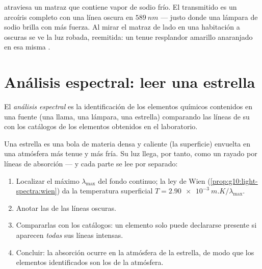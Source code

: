 \begin{example}\label{ex:g10:light-spectra:sodiumflask}
 atraviesa un matraz que contiene vapor de sodio frío. El
 transmitido es un arcoíris completo con una línea oscura en
$\qty{589}{nm}$ --- justo donde una lámpara de sodio brilla con más
fuerza. Al mirar el matraz de lado en una habitación a oscuras se ve la
luz robada, reemitida: un tenue resplandor amarillo anaranjado en esa
misma .
\end{example}

\section{Análisis espectral: leer una estrella}

\begin{definition}\label{def:g10:light-spectra:analysis}
El \emph{análisis espectral} es la
identificación de los elementos químicos contenidos en una fuente (una
llama, una lámpara, una estrella) comparando las líneas de su 
con los catálogos de los elementos obtenidos en el laboratorio.
\end{definition}

\begin{method}\label{met:g10:light-spectra:reading}
Una estrella es una bola de materia densa y caliente (la superficie)
envuelta en una atmósfera más tenue y más fría. Su luz llega, por tanto,
como un  rayado por líneas de absorción --- y cada
parte se lee por separado:
\begin{enumerate}
  \item Localizar el máximo $\lambda_{\max}$ del fondo continuo; la ley
        de Wien (\cref{prop:g10:light-spectra:wien}) da la temperatura
        superficial $T = \qty{2.90e-3}{m.K} / \lambda_{\max}$.
  \item Anotar las  de las líneas oscuras.
  \item Compararlas con los catálogos: un elemento solo puede declararse
        presente si aparecen \emph{todas} sus líneas intensas.
  \item Concluir: la absorción ocurre en la atmósfera de la estrella, de
        modo que los elementos identificados son los de la atmósfera.
\end{enumerate}
\end{method}

